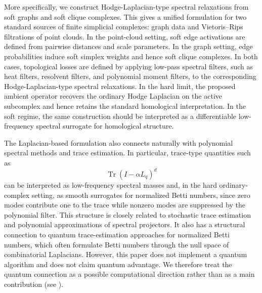 \documentclass[pdflatex,sn-mathphys-ay]{sn-jnl}%
\theoremstyle{thmstyleone}%
\theoremstyle{thmstyletwo}%
\theoremstyle{thmstylethree}%
\begin{document}
More specifically, we construct Hodge-Laplacian-type spectral relaxations from soft graphs and soft clique complexes. This gives a unified formulation for two standard sources of finite simplicial complexes: graph data and Vietoris--Rips filtrations of point clouds. In the point-cloud setting, soft edge activations are defined from pairwise distances and scale parameters. In the graph setting, edge probabilities induce soft simplex weights and hence soft clique complexes. In both cases, topological losses are defined by applying low-pass spectral filters, such as heat filters, resolvent filters, and polynomial moment filters, to the corresponding Hodge-Laplacian-type spectral relaxations.
In the hard limit, the proposed ambient operator recovers the ordinary Hodge Laplacian on the active subcomplex and hence retains the standard homological interpretation. In the soft regime, the same construction should be interpreted as a differentiable low-frequency spectral surrogate for homological structure.

The Laplacian-based formulation also connects naturally with polynomial spectral methods and trace estimation. In particular, trace-type quantities such as
\[
\operatorname{Tr}(I-\alpha L_q)^d
\]
can be interpreted as low-frequency spectral masses and, in the hard ordinary-complex setting, as smooth surrogates for normalized Betti numbers, since zero modes contribute one to the trace while nonzero modes are suppressed by the polynomial filter. This structure is closely related to stochastic trace estimation and polynomial approximations of spectral projectors. It also has a structural connection to quantum trace-estimation approaches for normalized Betti numbers, which often formulate Betti numbers through the null space of combinatorial Laplacians. However, this paper does not implement a quantum algorithm and does not claim quantum advantage. We therefore treat the quantum connection as a possible computational direction rather than as a main contribution (see \cite{lloyd2016quantum,akhalwaya2024comparing,gyurik2022towards,yamauchi2025quantum}).
\end{document}
